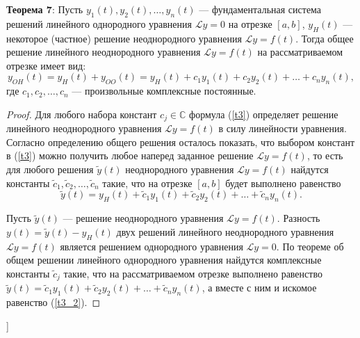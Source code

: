 \textbf{Теорема 7}: Пусть $y_1(t), y_2(t),\dots, y_n(t)$ --- фундаментальная система решений линейного однородного уравнения $\mathcal{L}y = 0$ на отрезке $[a, b]$, $y_H(t)$ --- некоторое (частное) решение неоднородного уравнения $\mathcal{L}y = f(t)$. Тогда общее решение линейного неоднородного уравнения $\mathcal{L}y = f(t)$ на рассматриваемом отрезке имеет вид:
\begin{equation}
    y_{OH}(t) = y_{H}(t) + y_{OO}(t) = y_H(t) + c_1y_1(t) + c_2y_2(t) + \dots  + c_ny_n(t),
    \label{t3}
\end{equation}
где $c_1,c_2,\dots,c_n$ --- произвольные комплексные постоянные.

\begin{proof} Для любого набора констант $c_j \in \mathbb{C}$ формула (\ref{t3}) определяет решение линейного неоднородного уравнения $\mathcal{L}y = f(t)$ в силу линейности уравнения. Согласно определению общего решения осталось показать, что выбором констант в (\ref{t3}) можно получить любое наперед заданное решение $\mathcal{L}y = f(t)$, то есть для любого решения $\tilde{y}(t)$ неоднородного уравнения $\mathcal{L}y = f(t)$ найдутся константы $\tilde{c}_1, \tilde{c}_2 ,\dots, \tilde{c}_n$ такие, что на отрезке $[a, b]$ будет выполнено равенство
\begin{equation}
    \tilde{y}(t) = y_H(t) + \tilde{c}_1y_1(t) + \tilde{c}_2y_2(t) +\dots + \tilde{c}_ny_n(t).
    \label{t3_2}
\end{equation}

Пусть $\tilde{y}(t)$ --- решение неоднородного уравнения $\mathcal{L}y = f(t)$. Разность $y(t) = \tilde{y}(t)-y_H(t)$ двух решений линейного неоднородного уравнения $\mathcal{L}y = f(t)$ является решением однородного уравнения $\mathcal{L}y = 0$. По теореме об общем решении линейного однородного уравнения найдутся комплексные константы $\tilde{c}_j$ такие, что на рассматриваемом отрезке выполнено равенство $\tilde{y}(t) = \tilde{c}_1y_1(t) + \tilde{c}_2y_2(t) +\dots + \tilde{c}_ny_n(t)$, а вместе с ним и искомое равенство (\ref{t3_2}).
\end{proof}




\bigbreak
[\cite[page 65-73]{denisov}]